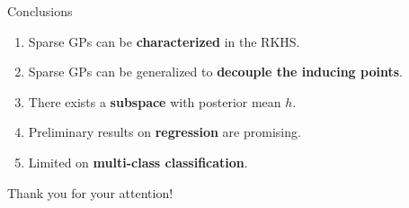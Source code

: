 \documentclass[aspectratio=149]{beamer}
\begin{document}
    \begin{frame}{Conclusions}
        \begin{enumerate}[<+->]
            \item Sparse GPs can be \textbf{characterized} in the RKHS.
            \item Sparse GPs can be generalized to \textbf{decouple the inducing points}.
            \item There exists a \textbf{subspace} with posterior mean \(h\).
            \item Preliminary results on \textbf{regression} are promising.
            \item Limited on \textbf{multi-class classification}.
        \end{enumerate}
    \end{frame}

    \begin{frame}[standout]
        Thank you for your attention!
    \end{frame}
\end{document}
